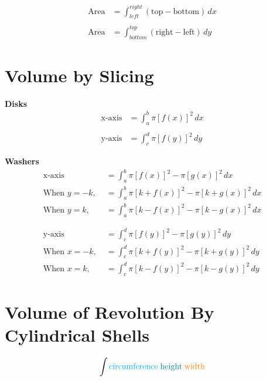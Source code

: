 \begin{framed}
  \begin{align*}
    \text{Area} &= \int_{left}^{right} (\text{top} - \text{bottom}) \, dx\\\\
    \text{Area} &= \int_{bottom}^{top} (\text{right} - \text{left}) \, dy
  \end{align*}
\end{framed}


\section{Volume by Slicing}

\begin{framed}
  \noindent \textbf{Disks}
  \begin{align*}
    \text{x-axis} &= \int_a^b \pi [f(x)]^2 \, dx\\\\
    \text{y-axis} &= \int_c^d \pi [f(y)]^2 \, dy
  \end{align*}
\end{framed}

\begin{framed}
  \noindent \textbf{Washers}
  \begin{align*}
    \text{x-axis} &= \int_a^b \pi [f(x)]^2 - \pi [g(x)]^2 \, dx\\
    \text{When } y=-k, \; &= \int_a^b \pi [k+f(x)]^2 - \pi [k+g(x)]^2 \, dx\\
    \text{When } y=k, \; &= \int_a^b \pi [k-f(x)]^2 - \pi [k-g(x)]^2 \, dx\\\\\\
    \text{y-axis} &= \int_c^d \pi [f(y)]^2 - \pi [g(y)]^2 \, dy\\
    \text{When } x=-k, \; &= \int_c^d \pi [k+f(y)]^2 - \pi [k+g(y)]^2 \, dy\\
    \text{When } x=k, \; &= \int_c^d \pi [k-f(y)]^2 - \pi [k-g(y)]^2 \, dy
  \end{align*}
\end{framed}


\section{Volume of Revolution By Cylindrical Shells}

\begin{equation*}
  \int \text{\textcolor{cyan}{circumference}} \;
       \text{\textcolor{teal}{height}} \;
       \text{\textcolor{orange}{width}}
\end{equation*}

